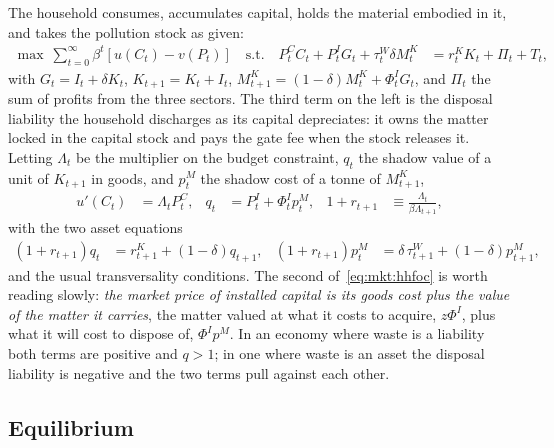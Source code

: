 The household consumes, accumulates capital, holds the material embodied in it, and takes the pollution stock as given:
\begin{align}
\max\ \sum_{t=0}^\infty\beta^t\left[u\left(C_t\right)-v\left(P_t\right)\right]
\quad\text{s.t.}\quad
P^C_tC_t+P^I_tG_t+\tau^W_t\delta M^K_t &= r^K_tK_t+\Pi_t+T_t,
\label{eq:mkt:hhbudget}
\end{align}
with $G_t=I_t+\delta K_t$, $K_{t+1}=K_t+I_t$, $M^K_{t+1}=\left(1-\delta\right)M^K_t+\Phi^I_tG_t$, and $\Pi_t$ the sum of profits from the three sectors. The third term on the left is the disposal liability the household discharges as its capital depreciates: it owns the matter locked in the capital stock and pays the gate fee when the stock releases it. Letting $\Lambda_t$ be the multiplier on the budget constraint, $q_t$ the shadow value of a unit of $K_{t+1}$ in goods, and $p^M_t$ the shadow cost of a tonne of $M^K_{t+1}$,
\begin{align}
u'\left(C_t\right) &= \Lambda_tP^C_t,
&
q_t &= P^I_t+\Phi^I_tp^M_t,
&
1+r_{t+1} &\equiv \frac{\Lambda_t}{\beta\Lambda_{t+1}},
\label{eq:mkt:hhfoc}
\end{align}
with the two asset equations
\begin{align}
\left(1+r_{t+1}\right)q_t &= r^K_{t+1}+\left(1-\delta\right)q_{t+1},
&
\left(1+r_{t+1}\right)p^M_t &= \delta\,\tau^W_{t+1}+\left(1-\delta\right)p^M_{t+1},
\label{eq:mkt:hhassets}
\end{align}
and the usual transversality conditions. The second of~\eqref{eq:mkt:hhfoc} is worth reading slowly: \emph{the market price of installed capital is its goods cost plus the value of the matter it carries}, the matter valued at what it costs to acquire, $z\Phi^I$, plus what it will cost to dispose of, $\Phi^Ip^M$. In an economy where waste is a liability both terms are positive and $q>1$; in one where waste is an asset the disposal liability is negative and the two terms pull against each other.

\subsection{Equilibrium}\label{sec:mkt:eq:def}

